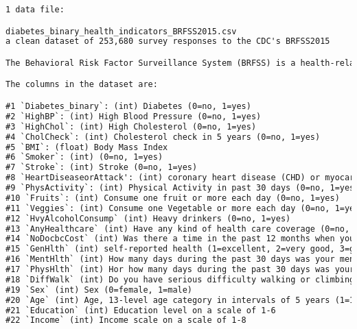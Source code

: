 \documentclass[12pt]{article}
\begin{document}
\begin{lstlisting}[language=TeX]
1 data file:

diabetes_binary_health_indicators_BRFSS2015.csv
a clean dataset of 253,680 survey responses to the CDC's BRFSS2015

The Behavioral Risk Factor Surveillance System (BRFSS) is a health-related telephone survey that is collected annually by the CDC. Each year, the survey collects responses from over 400,000 Americans on health-related risk behaviors, chronic health conditions, and the use of preventative services. It has been conducted every year since 1984. For this project, a csv of the dataset available on Kaggle for the year 2015 was used. This original dataset contains responses from 441,455 individuals and has 330 features. These features are either questions directly asked of participants, or calculated variables based on individual participant responses.

The columns in the dataset are:

#1 `Diabetes_binary`: (int) Diabetes (0=no, 1=yes)
#2 `HighBP`: (int) High Blood Pressure (0=no, 1=yes)
#3 `HighChol`: (int) High Cholesterol (0=no, 1=yes)
#4 `CholCheck`: (int) Cholesterol check in 5 years (0=no, 1=yes)
#5 `BMI`: (float) Body Mass Index
#6 `Smoker`: (int) (0=no, 1=yes)
#7 `Stroke`: (int) Stroke (0=no, 1=yes)
#8 `HeartDiseaseorAttack': (int) coronary heart disease (CHD) or myocardial infarction (MI), (0=no, 1=yes)
#9 `PhysActivity`: (int) Physical Activity in past 30 days (0=no, 1=yes)
#10 `Fruits`: (int) Consume one fruit or more each day (0=no, 1=yes)
#11 `Veggies`: (int) Consume one Vegetable or more each day (0=no, 1=yes)
#12 `HvyAlcoholConsump` (int) Heavy drinkers (0=no, 1=yes)
#13 `AnyHealthcare` (int) Have any kind of health care coverage (0=no, 1=yes)
#14 `NoDocbcCost` (int) Was there a time in the past 12 months when you needed to see a doctor but could not because of cost? (0=no, 1=yes)
#15 `GenHlth` (int) self-reported health (1=excellent, 2=very good, 3=good, 4=fair, 5=poor)
#16 `MentHlth` (int) How many days during the past 30 days was your mental health not good? (1-30 days)
#17 `PhysHlth` (int) Hor how many days during the past 30 days was your physical health not good? (1-30 days)
#18 `DiffWalk` (int) Do you have serious difficulty walking or climbing stairs? (0=no, 1=yes)
#19 `Sex` (int) Sex (0=female, 1=male)
#20 `Age` (int) Age, 13-level age category in intervals of 5 years (1=18-24, 2=25-29, ..., 12=75-79, 13=80 or older)
#21 `Education` (int) Education level on a scale of 1-6
#22 `Income` (int) Income scale on a scale of 1-8


\end{lstlisting}
\end{document}
